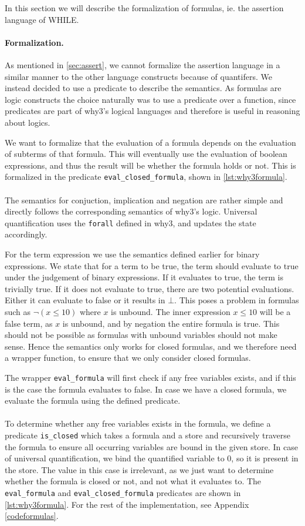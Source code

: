 In this section we will describe the formalization of formulas, ie. the assertion language of WHILE.

\paragraph{Formalization.}
As mentioned in \ref{sec:assert}, we cannot formalize the assertion language in a similar manner to
the other language constructs because of quantifers.
We instead decided to use a predicate to describe the semantics.
As formulas are logic constructs the choice naturally was to use a predicate over a function,
since predicates are part of why3's logical languages and therefore is useful in reasoning about logics.

We want to formalize that the evaluation of a formula depends on the evaluation of subterms
of that formula. This will eventually use the evaluation of boolean expressions, and thus
the result will be whether the formula holds or not.
This is formalized in the predicate \texttt{eval\_closed\_formula}, shown in \autoref{lst:why3formula}.
\\~\\
The semantics for conjuction, implication and negation are rather simple and directly follows the corresponding
semantics of why3's logic.
Universal quantification uses the \texttt{forall} defined in why3, and updates the state accordingly.

For the term expression we use the semantics defined earlier for binary expressions.
We state that for a term to be true, the term should evaluate to true under the judgement of binary expressions.
If it evaluates to true, the term is trivially true.
If it does not evaluate to true, there are two potential evaluations.
Either it can evaluate to false or it results in $\bot$.
This poses a problem in formulas such as $\neg (x \leq 10)$ where $x$ is unbound.
The inner expression $x \leq 10$ will be a false term, as $x$ is unbound, and by negation the entire formula is true.
This should not be possible as formulas with unbound variables should not make sense.
Hence the semantics only works for closed formulas, and we therefore need a wrapper function, to ensure that we only consider closed formulas.

The wrapper \texttt{eval\_formula} will first check if any free variables exists, and
if this is the case the formula evaluates to false.
In case we have a closed formula, we evaluate the formula using the defined predicate.
\\~\\
To determine whether any free variables exists in the formula, we define a predicate
\texttt{is\_closed} which takes a formula and a store and recursively traverse the formula to ensure all occurring variables are bound in the given store.
In case of universal quantification, we bind the quantified variable to 0,
so it is present in the store. The value in this case is irrelevant, as we just want to determine whether the formula is closed or not, and not what it evaluates to.
The \texttt{eval\_formula} and \texttt{eval\_closed\_formula} predicates are shown in
\autoref{lst:why3formula}. For the rest of the implementation, see Appendix \ref{codeformulas}.

